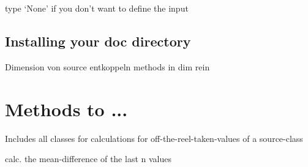 \documentclass[letterpaper,10pt,english]{sphinxmanual}
\begin{document}
\begin{fulllineitems}

\begin{fulllineitems}
\label{dimensions:diaGrabber.source._dimension._dimension.setPlotOnlyRecentPosition}
\end{fulllineitems}


\begin{fulllineitems}
\label{dimensions:diaGrabber.source._dimension._dimension.setPlotRange}
type `None' if you don't want to define the input

\end{fulllineitems}


\end{fulllineitems}



\section{Installing your doc directory}
\label{dimensions:installing-your-doc-directory}
Dimension von source entkoppeln
methods in dim rein


\chapter{Methods to ...}
\label{methods:methods-to}\label{methods::doc}\label{methods:module-diaGrabber.methods.calc}
Includes all classes for calculations for off-the-reel-taken-values of a source-class

\begin{fulllineitems}
\label{methods:diaGrabber.methods.calc.delta}
calc. the mean-difference of the last n values

\end{fulllineitems}

\end{document}
